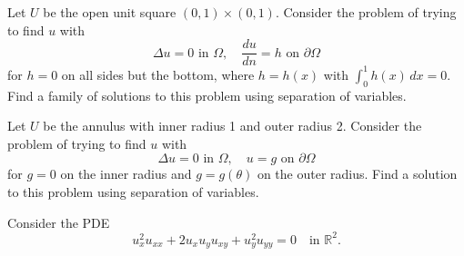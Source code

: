 \documentclass[12pt,fleqn,leqno]{exam}
\newcommand{\R}{\ensuremath{\mathbb{R}}}
\begin{document}
\begin{questions}

\question Let $U$ be the open unit square $(0,1) \times (0,1)$. Consider the problem of trying to find $u$ with
\[
\Delta u = 0 \text{ in $\Omega$}, \quad
\frac{du}{dn} = h \text{ on $\partial \Omega$}
\]
for $h = 0$ on all sides but the bottom, where $h = h(x)$ with $\int_0^1 h(x)\,dx = 0$. Find a family of solutions to this problem using separation of variables.

\question Let $U$ be the annulus with inner radius 1 and outer radius 2. Consider the problem of trying to find $u$ with
\[
\Delta u = 0 \text{ in $\Omega$}, \quad
u = g \text{ on $\partial \Omega$}
\]
for $g = 0$ on the inner radius and $g = g(\theta)$ on the outer radius. Find a solution to this problem using separation of variables.

\question Consider the PDE
\[u_x^2 u_{xx} + 2 u_x u_y u_{xy} + u_y^2 u_{yy} = 0 \quad \text{in $\R^2$}.\]


\end{questions}
\end{document}
